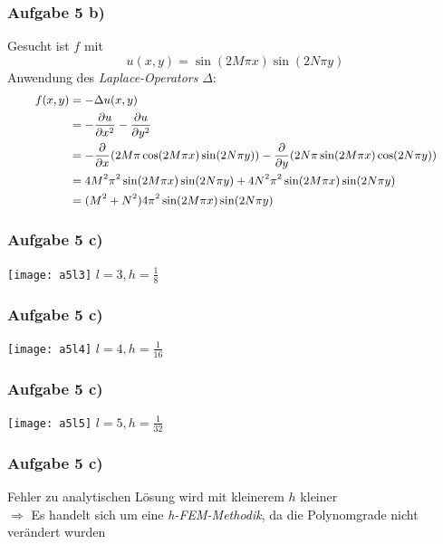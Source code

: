 \documentclass[german,notes,18pt]{beamer}
\begin{document}
	\begin{frame}
		\frametitle{Aufgabe 5 b)}
		
		Gesucht ist $f$ mit
		\begin{equation*}
		u(x,y)=\sin(2M\pi x)\sin(2N\pi y)
		\end{equation*}
		Anwendung des \emph{Laplace-Operators} $\Delta$:
		\begin{equation*}
		\small
		\begin{split}
		f(x,y)&=-\Delta u(x,y) \\
		&= -\frac{\partial u}{\partial x^2}-\frac{\partial u}{\partial y^2} \\
		&= -\frac{\partial}{\partial x}(2M\pi\cos(2M\pi x)\sin(2N\pi y)) -\frac{\partial}{\partial y}(2N\pi\sin(2M\pi x)\cos(2N\pi y)) \\
		&= 4M^2\pi^2\sin(2M\pi x)\sin(2N\pi y) + 4N^2\pi^2\sin(2M\pi x)\sin(2N\pi y) \\
		&= (M^2+N^2)4\pi^2\sin(2M\pi x)\sin(2N\pi y)
		\end{split}
		\end{equation*}
	\end{frame}

	\begin{frame}
		\frametitle{Aufgabe 5 c)}
		\vspace{-12em}
		\texttt{[image: a5l3]}
		\vspace{-12em}
		$l=3,h=\frac{1}{8}$
	\end{frame}

	\begin{frame}
	\frametitle{Aufgabe 5 c)}
	\vspace{-12em}
	\texttt{[image: a5l4]}
	\vspace{-12em}
	$l=4,h=\frac{1}{16}$
	\end{frame}
	
	\begin{frame}
	\frametitle{Aufgabe 5 c)}
	\vspace{-12em}
	\texttt{[image: a5l5]}
	\vspace{-12em}
	$l=5,h=\frac{1}{32}$
	\end{frame}

	\begin{frame}
		\frametitle{Aufgabe 5 c)}
		
		Fehler zu analytischen Lösung wird mit kleinerem $h$ kleiner\\
		$\Rightarrow$ Es handelt sich um eine \emph{h-FEM-Methodik}, da die Polynomgrade nicht verändert wurden
	\end{frame}
	
\end{document}
